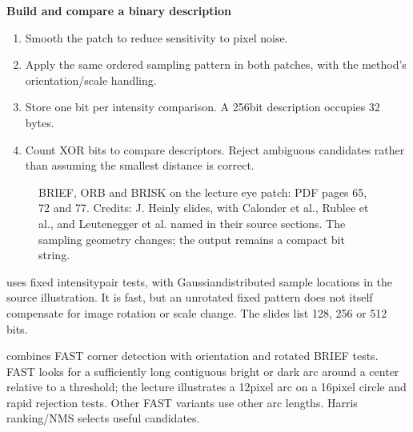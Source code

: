 \documentclass[letterpaper,11pt,english,openany,oneside]{jupyterBook}
\begin{document}
\begin{TextbookBox}
\textbf{Build and compare a binary description}\par\smallskip
\begin{enumerate}
%
\item {}
\sphinxAtStartPar
Smooth the patch to reduce sensitivity to pixel noise.

\item {}
\sphinxAtStartPar
Apply the same ordered sampling pattern in both patches, with the method’s orientation/scale handling.

\item {}
\sphinxAtStartPar
Store one bit per intensity comparison. A 256\sphinxhyphen{}bit description occupies 32 bytes.

\item {}
\sphinxAtStartPar
Count XOR bits to compare descriptors. Reject ambiguous candidates rather than assuming the smallest distance is correct.

\end{enumerate}

\end{TextbookBox}

\begin{figure}[H]
\centering
\capstart

\noindent{}
\caption{BRIEF, ORB and BRISK on the lecture eye patch: PDF pages 65, 72 and 77. Credits: J. Heinly slides, with Calonder et al., Rublee et al., and Leutenegger et al. named in their source sections. The sampling geometry changes; the output remains a compact bit string.}\label{\detokenize{lectures/lecture05/descriptors:fig-lec05-descriptor-patterns}}\end{figure}

\sphinxAtStartPar
{} uses fixed intensity\sphinxhyphen{}pair tests, with Gaussian\sphinxhyphen{}distributed sample locations in the source illustration. It is fast, but an unrotated fixed pattern does not itself compensate for image rotation or scale change. The slides list 128, 256 or 512 bits.

\sphinxAtStartPar
{} combines FAST corner detection with orientation and rotated BRIEF tests. FAST looks for a sufficiently long contiguous bright or dark arc around a center relative to a threshold; the lecture illustrates a 12\sphinxhyphen{}pixel arc on a 16\sphinxhyphen{}pixel circle and rapid rejection tests. Other FAST variants use other arc lengths. Harris ranking/NMS selects useful candidates.
\end{document}
